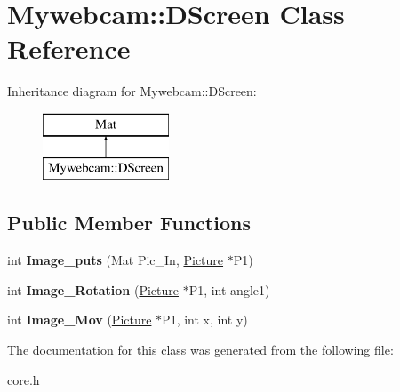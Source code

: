 \hypertarget{class_mywebcam_1_1_d_screen}{}\section{Mywebcam\+:\+:D\+Screen Class Reference}
\label{class_mywebcam_1_1_d_screen}
Inheritance diagram for Mywebcam\+:\+:D\+Screen\+:\begin{figure}[H]
\begin{center}
\leavevmode
\includegraphics[height=2.000000cm]{class_mywebcam_1_1_d_screen}
\end{center}
\end{figure}
\subsection*{Public Member Functions}
\begin{DoxyCompactItemize}
\item 
\mbox{\label{class_mywebcam_1_1_d_screen_a707299b0c958a02af890a27585e9c511}} 
int {\bfseries Image\+\_\+puts} (Mat Pic\+\_\+\+In, \hyperlink{class_mywebcam_1_1_picture}{Picture} $\ast$P1)
\item 
\mbox{\label{class_mywebcam_1_1_d_screen_a26da970a8c7b35f1f5df42ca898ce63b}} 
int {\bfseries Image\+\_\+\+Rotation} (\hyperlink{class_mywebcam_1_1_picture}{Picture} $\ast$P1, int angle1)
\item 
\mbox{\label{class_mywebcam_1_1_d_screen_a2ff8a41e336d4b258fcbd485d18e0c68}} 
int {\bfseries Image\+\_\+\+Mov} (\hyperlink{class_mywebcam_1_1_picture}{Picture} $\ast$P1, int x, int y)
\end{DoxyCompactItemize}


The documentation for this class was generated from the following file\+:\begin{DoxyCompactItemize}
\item 
core.\+h\end{DoxyCompactItemize}
